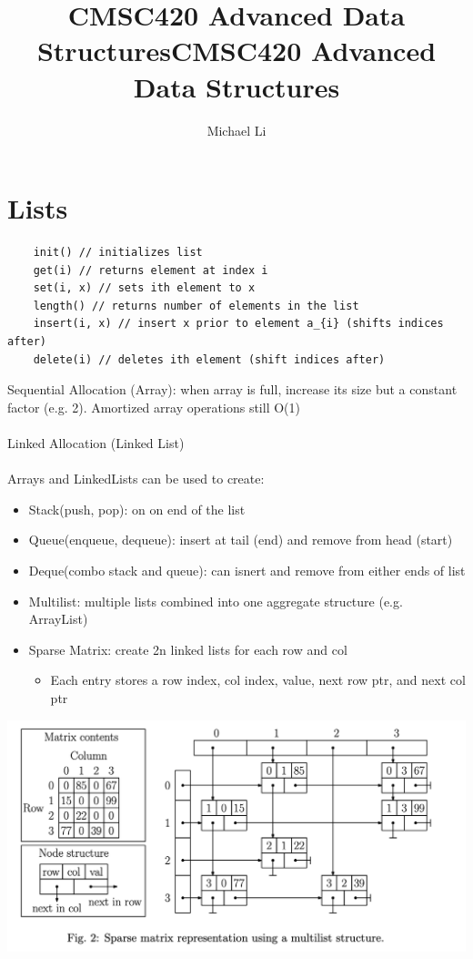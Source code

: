 \documentclass{article}
\title{CMSC420 Advanced Data Structures}
\date{}
\begin{document}
 
  \author{Michael Li}
  \title{CMSC420 Advanced Data Structures}
  \maketitle
  \tableofcontents
  \newpage
  \noindent \section{Lists}
  \begin{lstlisting}
    init() // initializes list
    get(i) // returns element at index i
    set(i, x) // sets ith element to x
    length() // returns number of elements in the list
    insert(i, x) // insert x prior to element a_{i} (shifts indices after)
    delete(i) // deletes ith element (shift indices after)
  \end{lstlisting}
  Sequential Allocation (Array): when array is full, increase  its size but a constant factor (e.g. 2). Amortized array operations still O(1) \\ \\
  Linked Allocation (Linked List) \\ \\
  Arrays and LinkedLists can be used to create:
  \begin{itemize}[noitemsep]
  \item Stack(push, pop): on on end of the list
  \item Queue(enqueue, dequeue): insert at tail (end) and remove from head (start)
  \item Deque(combo stack and queue): can isnert and remove from either ends of list
  \item Multilist: multiple lists combined into one aggregate structure (e.g. ArrayList)
  \item Sparse Matrix: create 2n linked lists for each row and col
    \begin{itemize}[noitemsep]
      \item Each entry stores a row index, col index, value, next row ptr, and next col ptr
    \end{itemize}
  \end{itemize}
  \begin{center}
    \includegraphics[scale=0.3]{Fig_2}
  \end{center}
\end{document}
